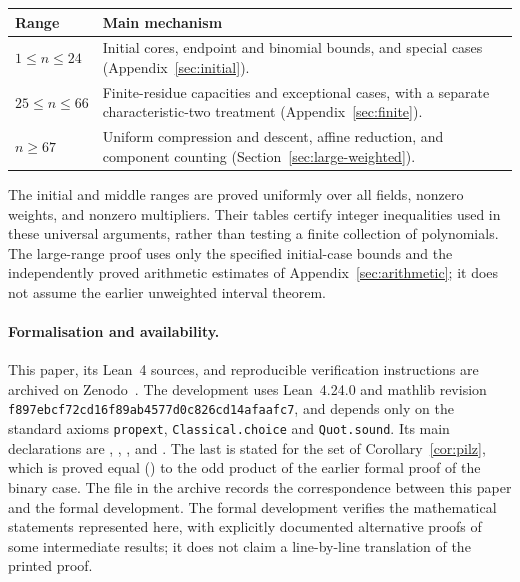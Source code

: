 \documentclass[11pt]{article}
\numberwithin{equation}{section}
\theoremstyle{definition}\newtheorem{definition}[theorem]{Definition}
\theoremstyle{remark}\newtheorem{remark}[theorem]{Remark}
\begin{document}
\begin{center}
\begin{tabular}{@{}>{\raggedright\arraybackslash}p{.17\linewidth}>{\raggedright\arraybackslash}p{.77\linewidth}@{}}
\toprule
Range & Main mechanism \\
\midrule
$1\le n\le24$ & Initial cores, endpoint and binomial bounds, and special
cases (Appendix~\ref{sec:initial}). \\
$25\le n\le66$ & Finite-residue capacities and exceptional cases, with
a separate characteristic-two treatment (Appendix~\ref{sec:finite}). \\
$n\ge67$ & Uniform compression and descent, affine reduction, and
component counting (Section~\ref{sec:large-weighted}). \\
\bottomrule
\end{tabular}
\end{center}
The initial and middle ranges are proved uniformly over all fields,
nonzero weights, and nonzero multipliers. Their tables certify integer
inequalities used in these universal arguments, rather than testing a
finite collection of polynomials. The large-range proof uses only the
specified initial-case bounds and the independently proved arithmetic
estimates of Appendix~\ref{sec:arithmetic}; it does not assume the earlier
unweighted interval theorem.

\begingroup\raggedright
\paragraph{Formalisation and availability.}
This paper, its Lean~4 sources, and reproducible verification
instructions are archived on Zenodo~\cite{Archive}. The development uses
Lean~4.24.0 and mathlib revision
\texttt{f897ebcf72cd16f89ab4577d0c826cd14afaafc7}, and depends only on
the standard axioms \texttt{propext}, \texttt{Classical.choice} and
\texttt{Quot.sound}. Its main declarations are
,
,
, and
. The last is stated for
the set of Corollary~\ref{cor:pilz}, which is proved equal
() to the odd product
 of the earlier formal proof of the binary case.
The file  in the archive records the
correspondence between this paper and the formal development. The
formal development verifies the mathematical statements represented
here, with explicitly documented alternative proofs of some intermediate
results; it does not claim a line-by-line translation of the printed
proof.
\end{document}
